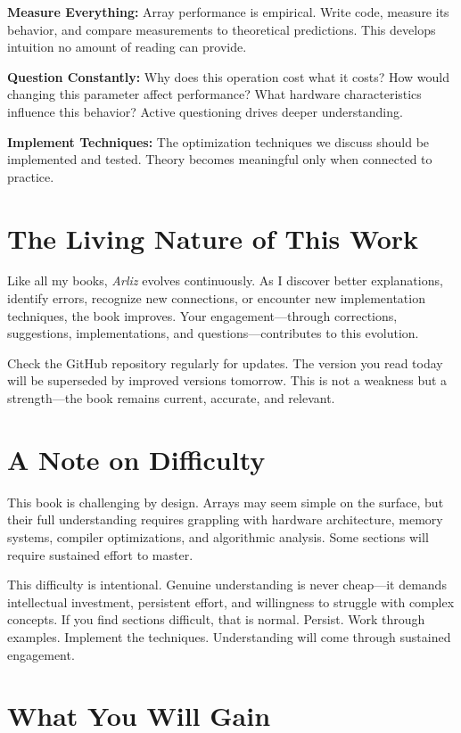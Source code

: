 \textbf{Measure Everything:} Array performance is empirical. Write code, measure its behavior, and compare measurements to theoretical predictions. This develops intuition no amount of reading can provide.

\textbf{Question Constantly:} Why does this operation cost what it costs? How would changing this parameter affect performance? What hardware characteristics influence this behavior? Active questioning drives deeper understanding.

\textbf{Implement Techniques:} The optimization techniques we discuss should be implemented and tested. Theory becomes meaningful only when connected to practice.

\section*{The Living Nature of This Work}

Like all my books, \textit{Arliz} evolves continuously. As I discover better explanations, identify errors, recognize new connections, or encounter new implementation techniques, the book improves. Your engagement—through corrections, suggestions, implementations, and questions—contributes to this evolution.

Check the GitHub repository regularly for updates. The version you read today will be superseded by improved versions tomorrow. This is not a weakness but a strength—the book remains current, accurate, and relevant.

\section*{A Note on Difficulty}

This book is challenging by design. Arrays may seem simple on the surface, but their full understanding requires grappling with hardware architecture, memory systems, compiler optimizations, and algorithmic analysis. Some sections will require sustained effort to master.

This difficulty is intentional. Genuine understanding is never cheap—it demands intellectual investment, persistent effort, and willingness to struggle with complex concepts. If you find sections difficult, that is normal. Persist. Work through examples. Implement the techniques. Understanding will come through sustained engagement.

\section*{What You Will Gain}

